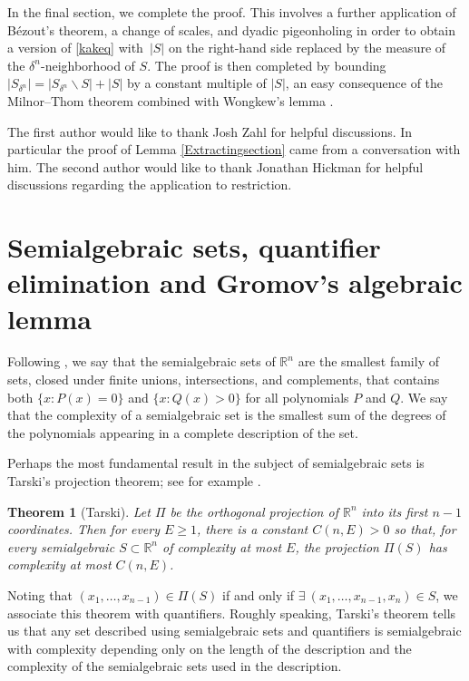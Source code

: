 \documentclass[letterpaper, reqno, 11pt]{amsart}
\newtheorem{thm}{Theorem}[section]
\theoremstyle{remark}
\numberwithin{equation}{section}
\begin{document}
In the final section, we complete the proof. This involves a further application of B\'ezout's theorem, a change of scales, and dyadic pigeonholing in order to obtain a version of \eqref{kakeq} with~$|S|$ on the right-hand side replaced by the measure of the $\delta^n$-neighborhood of $S$. The proof is then completed by bounding $|S_{\delta^n}|=|S_{\delta^n}\backslash S|+|S|$ by a constant multiple of $|S|$, an easy consequence of the Milnor--Thom theorem \cite{M} combined with Wongkew's lemma \cite{W}.

\vspace{0.5em}

 The first author would like to thank Josh Zahl for helpful discussions. In particular the proof of Lemma \ref{Extractingsection} came
from a conversation with him. The second author would like to thank Jonathan Hickman for helpful discussions regarding the application to restriction.



\section{Semialgebraic sets, quantifier elimination and Gromov's algebraic lemma}

Following \cite{BPR}, we say that the semialgebraic sets of $\mathbb{R}^n$ are the smallest family of sets, closed under finite unions, intersections, and complements, that contains both $\{x: P(x)=0\}$ and $\{x: Q(x) > 0\}$ for all  polynomials $P$ and $Q$.
We say that the complexity of a semialgebraic set is the smallest sum of the degrees of the polynomials appearing in a complete description of the set.

Perhaps the most fundamental result in the subject of semialgebraic sets is Tarski's projection theorem; see for example \cite{BPR}.

\begin{thm}[Tarski] \label{Tarski}
Let $\Pi $ be the orthogonal projection of $\mathbb{R}^n$ into its first $n-1$ coordinates. Then for every $E\ge 1$, there is a constant $C(n,E) > 0$ so that, for every  semialgebraic $S \subset \mathbb{R}^n$ of complexity at most $E$, the projection $\Pi (S)$ has complexity at most $C(n,E)$. 
\end{thm}

Noting that $(x_1,\dots,x_{n-1}) \in \Pi(S)$ if and only if $\exists\ (x_1,\dots,x_{n-1},x_n) \in S$, we associate this theorem with quantifiers.  Roughly speaking, Tarski's theorem tells us that any set described using semialgebraic sets and quantifiers is semialgebraic with complexity depending
only on the length of the description and the complexity of the semialgebraic sets used in the description.
\end{document}
